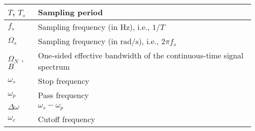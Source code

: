\begin{xltabular}{\textwidth}{XX}
	\(T\)\cite{oppenheimDiscreteTimeSignalProcessing2009}, \(T_s\)                                  & Sampling period                                                                                                                                                                                             \\ \hline
	\(f_s\)                                                                                         & Sampling frequency (in \(\si{\hertz}\)), i.e., \(1/T\)                                                                                                                                                      \\ \hline
	\(\Omega_s\)                                                                                    & Sampling frequency (in \(\si{\radian\per\second}\)), i.e., \(2\pi f_s\)                                                                                                                                     \\ \hline
	\(\Omega_N\) \cite{oppenheimDiscreteTimeSignalProcessing2009}, \(B\)                            & One-sided effective bandwidth of the continuous-time signal spectrum                                                                                                                                        \\ \hline
	\(\omega_s\)                                                                                    & Stop frequency \cite{ingleDigitalSignalProcessing2000}                                                                                                                                                      \\ \hline
	\(\omega_p\)                                                                                    & Pass frequency \cite{ingleDigitalSignalProcessing2000}                                                                                                                                                      \\ \hline
	\(\Delta \omega\)                                                                               & \(\omega_s - \omega_p\) \cite{ingleDigitalSignalProcessing2000}                                                                                                                                             \\ \hline
	\(\omega_c\)                                                                                    & Cutoff frequency \cite{ingleDigitalSignalProcessing2000}                                                                                                                                                    \\ \hline

\end{xltabular}
